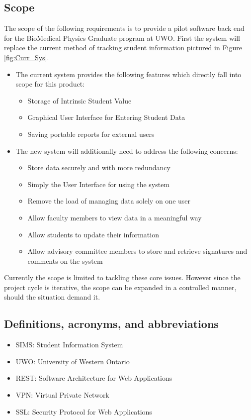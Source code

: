 \documentclass[11pt,a4paper]{report}
\begin{document}
\subsection{Scope}
The scope of the following requirements is to provide a pilot software back end for the BioMedical Physics
Graduate program at UWO. First the system will replace the current method of tracking student information
pictured in Figure \ref{fig:Curr_Sys}.
\begin{itemize}
\item The current system provides the following features which directly fall into scope for this product:
\begin{itemize}
\item Storage of Intrinsic Student Value
\item Graphical User Interface for Entering Student Data
\item Saving portable reports for external users
\end{itemize}
\item The new system will additionally need to address the following concerns:
\begin{itemize} 
\item Store data securely and with more redundancy
\item Simply the User Interface for using the system
\item Remove the load of managing data solely on one user
\item Allow faculty members to view data in a meaningful way
\item Allow students to update their information
\item Allow advisory committee members to store and retrieve signatures and comments on the system
\end{itemize} 
\end{itemize}
Currently the scope is limited to tackling these core issues. However since the project cycle is iterative,
the scope can be expanded in a controlled manner, should the situation demand it.
\subsection{Definitions, acronyms, and abbreviations}
\begin{itemize}
\item SIMS: Student Information System
\item UWO: University of Western Ontario
\item REST: Software Architecture for Web Applications
\item VPN: Virtual Private Network
\item SSL: Security Protocol for Web Applications
\end{itemize}
\end{document}
